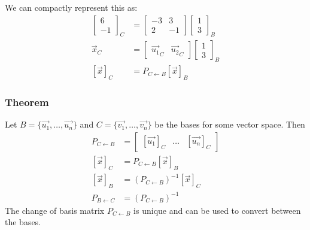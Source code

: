 \documentclass{math}
\begin{document}
We can compactly represent this as:
\begin{align*}
  \begin{bmatrix}6 \\ -1\end{bmatrix}_C &= \begin{bmatrix}
    -3 & 3 \\
    2 & -1
  \end{bmatrix}\begin{bmatrix}1 \\ 3\end{bmatrix}_B \\
  \vec{x}_C &= \begin{bmatrix}\vec{u_1}_C & \vec{u_2}_C\end{bmatrix}
    \begin{bmatrix}1 \\ 3\end{bmatrix}_B \\
  [\vec{x}]_C &= P_{C\leftarrow B}[\vec{x}]_B
\end{align*}

\subsubsection*{Theorem}
Let \( B = \{\vec{u_1},\dots,\vec{u_n}\} \) and \( C =
\{\vec{v_1},\dots,\vec{v_n}\} \) be the bases for some vector space. Then
\begin{align*}
  P_{C\leftarrow B} &= \begin{bmatrix}
    [\vec{u_1}]_C & \dots & [\vec{u_n}]_C
  \end{bmatrix} \\
  [\vec{x}]_C &= P_{C\leftarrow B}[\vec{x}]_B \\
  [\vec{x}]_B &= (P_{C\leftarrow B})^{-1}[\vec{x}]_C \\
  P_{B\leftarrow C} &= (P_{C\leftarrow B})^{-1}
\end{align*}
The change of basis matrix \( P_{C\leftarrow B} \) is unique and can be used
to convert between the bases.
\end{document}
